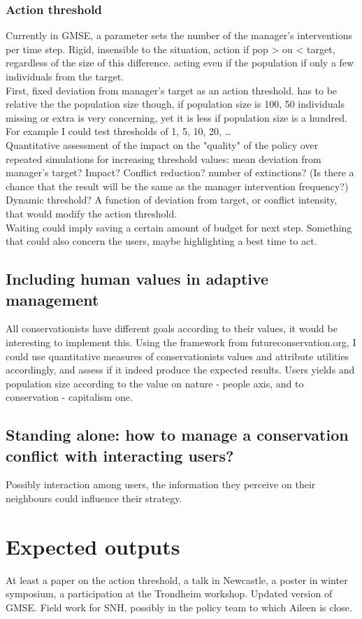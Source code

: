 \documentclass[12pt,a4paper]{article}
\begin{document}
\subsubsection{Action threshold}
Currently in GMSE, a parameter sets the number of the manager's interventions per time step. Rigid, insensible to the situation, action if pop > ou < target, regardless of the size of this difference. acting even if the population if only a few individuals from the target.\\
First, fixed deviation from manager's target as an action threshold. has to be relative the the population size though, if population size is 100, 50 individuals missing or extra is very concerning, yet it is less if population size is a hundred. For example I could test thresholds of 1, 5, 10, 20, \dots\\ 
Quantitative assessment of the impact on the "quality" of the policy over repeated simulations for increasing threshold values: mean deviation from manager's target? Impact? Conflict reduction? number of extinctions? (Is there a chance that the result will be the same as the manager intervention frequency?)\\
Dynamic threshold? A function of deviation from target, or conflict intensity, that would modify the action threshold.\\
Waiting could imply saving a certain amount of budget for next step. Something that could also concern the users, maybe highlighting a best time to act.

\subsection{Including human values in adaptive management}

All conservationists have different goals according to their values, it would be interesting to implement this. Using the framework from futureconservation.org, I could use quantitative measures of conservationists values and attribute utilities accordingly, and assess if it indeed produce the expected results. Users yields and population size according to the value on nature - people axis, and to conservation - capitalism one. 

\subsection{Standing alone: how to manage a conservation conflict with interacting users?}

Possibly interaction among users, the information they perceive on their neighbours could influence their strategy.

\section{Expected outputs}

At least a paper on the action threshold, a talk in Newcastle, a poster in winter symposium, a participation at the Trondheim workshop. Updated version of GMSE. Field work for SNH, possibly in the policy team to which Aileen is close.
\end{document}

